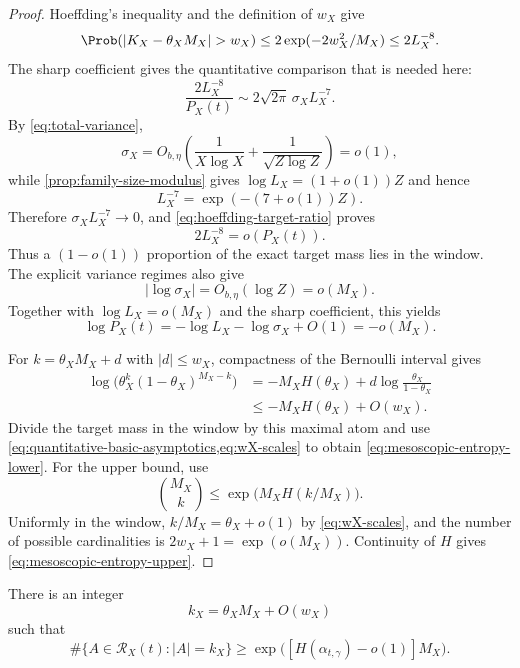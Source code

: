 \begin{proof}
Hoeffding's inequality and the definition of $w_X$ give
\begin{equation}
\label{eq:hoeffding-window}
 \Prob(|K_X-\theta_XM_X|>w_X)
 \leq2\exp(-2w_X^2/M_X)\leq2L_X^{-8}.
\end{equation}
The sharp coefficient gives the quantitative comparison that is needed here:
\begin{equation}
\label{eq:hoeffding-target-ratio}
 \frac{2L_X^{-8}}{P_X(t)}
 \sim2\sqrt{2\pi}\,\sigma_XL_X^{-7}.
\end{equation}
By \cref{eq:total-variance},
\[
 \sigma_X=O_{b,\eta}\!\left(\frac1{X\log X}+\frac1{\sqrt{Z\log Z}}\right)=o(1),
\]
while \cref{prop:family-size-modulus} gives $\log L_X=(1+o(1))Z$ and hence
\[
 L_X^{-7}=\exp(-(7+o(1))Z).
\]
Therefore $\sigma_XL_X^{-7}\to0$, and \cref{eq:hoeffding-target-ratio} proves
\begin{equation}
\label{eq:hoeffding-negligible}
 2L_X^{-8}=o(P_X(t)).
\end{equation}
Thus a $(1-o(1))$ proportion of the exact target mass lies in the window.  The explicit variance regimes also give
\[
 |\log\sigma_X|=O_{b,\eta}(\log Z)=o(M_X).
\]
Together with $\log L_X=o(M_X)$ and the sharp coefficient, this yields
\begin{equation}
\label{eq:target-probability-subexponential}
 \log P_X(t)=-\log L_X-\log\sigma_X+O(1)=-o(M_X).
\end{equation}

For $k=\theta_XM_X+d$ with $|d|\leq w_X$, compactness of the Bernoulli interval gives
\[
\begin{aligned}
 \log\bigl(\theta_X^k(1-\theta_X)^{M_X-k}\bigr)
 &=-M_XH(\theta_X)+d\log\frac{\theta_X}{1-\theta_X}\\
 &\leq-M_XH(\theta_X)+O(w_X).
\end{aligned}
\]
Divide the target mass in the window by this maximal atom and use \cref{eq:quantitative-basic-asymptotics,eq:wX-scales} to obtain \cref{eq:mesoscopic-entropy-lower}.  For the upper bound, use
\[
 \binom{M_X}{k}\leq\exp\bigl(M_XH(k/M_X)\bigr).
\]
Uniformly in the window, $k/M_X=\theta_X+o(1)$ by \cref{eq:wX-scales}, and the number of possible cardinalities is $2w_X+1=\exp(o(M_X))$.  Continuity of $H$ gives \cref{eq:mesoscopic-entropy-upper}.
\end{proof}

\begin{corollary}
\label{cor:exact-cardinality-extraction}
There is an integer
\[
 k_X=\theta_XM_X+O(w_X)
\]
such that
\begin{equation}
\label{eq:exact-cardinality-count}
 \#\{A\in\mathcal R_X(t):|A|=k_X\}
 \geq\exp\bigl([H(\alpha_{t,\gamma})-o(1)]M_X\bigr).
\end{equation}
\end{corollary}

